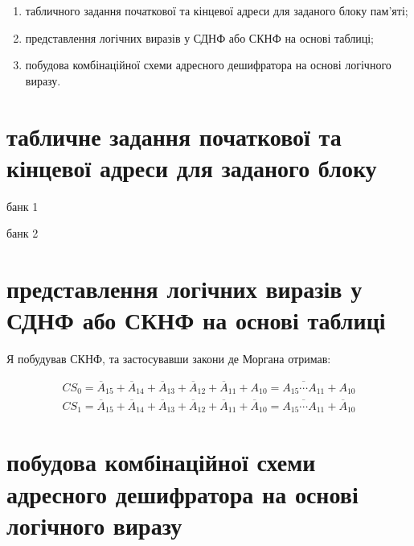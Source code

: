 \documentclass[a4paper, 12pt, oneside]{extreport}
\begin{document}
\begin{enumerate}
\item табличного задання початкової та кінцевої адреси для заданого блоку
пам'яті;
\item представлення логічних виразів у СДНФ або СКНФ на основі таблиці;
\item побудова комбінаційної схеми адресного дешифратора на основі логічного
виразу.
\end{enumerate}

\section{табличне задання початкової та кінцевої адреси для заданого блоку}

\setlength{\tabcolsep}{3pt}
\begin{table}[h]
	\centering
	\caption{банк 1}
\end{table}

\begin{table}[h]
	\centering
	\caption{банк 2}
\end{table}


\section{представлення логічних виразів у СДНФ або СКНФ на основі таблиці}

Я побудував СКНФ, та застосувавши закони де Моргана отримав:

\begin{align}
	CS_0=
	\overline A_{15}
	+\overline A_{14}
	+\overline A_{13}
	+\overline A_{12}
	+\overline A_{11}
	+ A_{10}
	=
	\overline
	{
		A_{15}
		\cdots
		A_{11}
	}
	+ A_{10}
	\\
	CS_1=
	\overline A_{15}
	+\overline A_{14}
	+\overline A_{13}
	+\overline A_{12}
	+\overline A_{11}
	+\overline A_{10}
	=
	\overline
	{
		A_{15}
		\cdots
		A_{11}
	}
	+\overline A_{10}
\end{align}

\section{побудова комбінаційної схеми адресного дешифратора на основі логічного виразу}
\end{document}
